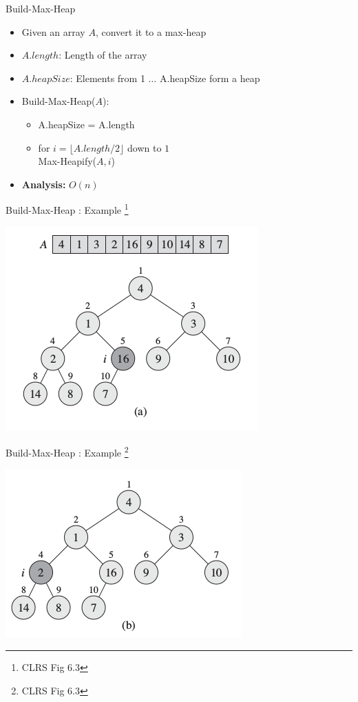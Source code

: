 \documentclass{beamer}
\begin{document}
\begin{frame}{Build-Max-Heap}
    \begin{itemize}
        \item Given an array $A$, convert it to a max-heap
        \item $A.length$: Length of the array
        \item $A.heapSize$: Elements from 1 $\ldots$ A.heapSize form a heap
        \item Build-Max-Heap($A$):
        \begin{itemize}
            \item A.heapSize = A.length
            \item for $i = \lfloor A.length / 2 \rfloor$ down to $1$ \\ \qquad Max-Heapify($A,i$)
        \end{itemize}
        \item {\bf Analysis:} $O(n)$
    \end{itemize}
\end{frame}


\begin{frame}{Build-Max-Heap : Example \footnote{CLRS Fig 6.3}}
    \begin{center}
        \includegraphics[scale=0.5]{buildMaxHeap1.png}
    \end{center}
\end{frame}


\begin{frame}{Build-Max-Heap : Example \footnote{CLRS Fig 6.3}}
    \begin{center}
        \includegraphics[scale=0.5]{buildMaxHeap2.png}
    \end{center}
\end{frame}
\end{document}
